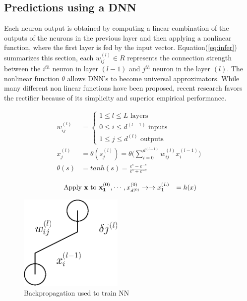 \documentclass[letterpaper, 10 pt, conference]{ieeeconf}
\begin{document}
\subsection{Predictions using a DNN}

Each neuron output is obtained by computing a linear combination of the outputs
of the neurons in the previous layer and then applying a nonlinear function, 
where the first layer is fed by the input vector.
Equation(\ref{eq:infer}) summarizes this section, each $w_{ij}^{(l)} \in R$
represents the connection strength between the $i^{th}$ neuron in layer $(l-1)$
and $j^{th}$ neuron in the layer $(l)$. The nonlinear function $\theta$ allows
DNN's to become universal approximators. While many different non linear functions
have been proposed, recent research favors the rectifier because of its simplicity
and superior empirical performance.


\begin{align}
  w_{ij}^{(l)} &=
  \begin{cases}
    1 \le l \le L \text{  layers  } \\
    0 \le i \le d^{(l-1)} \text{ inputs  } \\
    1 \le j \le d^{(l)} \text{ outputs  }
  \end{cases} \\
  x_{j}^{(l)} &= \theta(s_{j}^{(l)}) = \theta\Bigg( \sum_{i=0}^{d^{(l-1)}}
                        w_{ij}^{(l)} x_{i}^{(l-1)}  \Bigg)    \\        
 \theta(s)  &= tanh(s) = \frac{e^{s} - e^{-s}}{e^s + e^{-s}} 
  \label{eq:infer}
\end{align}

\begin{align}
  { \text{ Apply } } \bf{x} \text{ to } x_{1}^{(0)}, &\cdots, x_{d^{(0)}}^{(0)}  \rightarrow \rightarrow x_{1}^{(L)} &= h(x) \\
\end{align}



          \begin{figure}[h]
              \centering
              \includegraphics[width=50mm,scale=0.3]{train}
              \caption{Backpropagation used to train NN}
              \label{q1}
          \end{figure}
\end{document}
